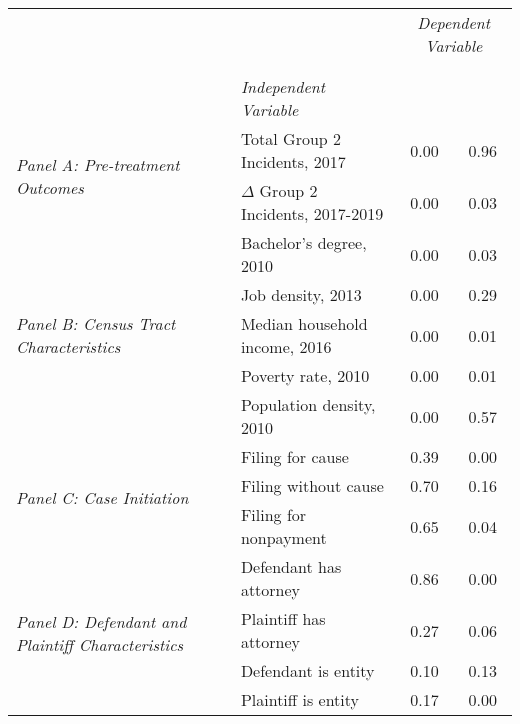 \begin{tabular}{llcc}
\toprule
 &  & \multicolumn{2}{c}{\textit{Dependent Variable}} \\
\cline{3-4}
\\
 &  &  &  \\
 & \emph{Independent Variable} &  &  \\
\midrule
\multirow[c]{2}{3cm}{\textit{Panel A: Pre-treatment Outcomes}} & Total Group 2 Incidents, 2017 & 0.00 & 0.96 \\
 & $\Delta$ Group 2 Incidents, 2017-2019 & 0.00 & 0.03 \\
\cline{1-4}
\multirow[c]{5}{3cm}{\textit{Panel B: Census Tract Characteristics}} & Bachelor's degree, 2010 & 0.00 & 0.03 \\
 & Job density, 2013 & 0.00 & 0.29 \\
 & Median household income, 2016 & 0.00 & 0.01 \\
 & Poverty rate, 2010 & 0.00 & 0.01 \\
 & Population density, 2010 & 0.00 & 0.57 \\
\cline{1-4}
\multirow[c]{3}{3cm}{\textit{Panel C: Case Initiation}} & Filing for cause & 0.39 & 0.00 \\
 & Filing without cause & 0.70 & 0.16 \\
 & Filing for nonpayment & 0.65 & 0.04 \\
\cline{1-4}
\multirow[c]{4}{3cm}{\textit{Panel D: Defendant and Plaintiff Characteristics}} & Defendant has attorney & 0.86 & 0.00 \\
 & Plaintiff has attorney & 0.27 & 0.06 \\
 & Defendant is entity & 0.10 & 0.13 \\
 & Plaintiff is entity & 0.17 & 0.00 \\
\cline{1-4}
\bottomrule
\end{tabular}
